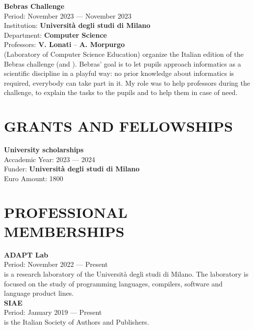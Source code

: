 \documentclass[a4paper,9pt]{extarticle}
\begin{document}
\noindent
\textbf{Bebras Challenge} \\
Period: November 2023 --- November 2023 \\
Institution: \textbf{Universit\`a degli studi di Milano} \\
Department: \textbf{Computer Science} \\
Professors: \textbf{V. Lonati} -- \textbf{A. Morpurgo} \\
\aladdin (Laboratory of Computer Science Education) organize the Italian edition of the Bebras challenge (\bebrasit and \bebrasint). Bebras' goal is to let pupils approach informatics as a scientific discipline in a playful way: no prior knowledge about informatics is required, everybody can take part in it.
My role was to help professors during the challenge, to explain the tasks to the pupils and to help them in case of need. \\


\section*{GRANTS AND FELLOWSHIPS}

\noindent
\newline
\textbf{University scholarships} \\
Accademic Year: 2023 --- 2024 \\
Funder: \textbf{Universit\`a degli studi di Milano} \\
Euro Amount: 1800\texteuro  \\


\section*{PROFESSIONAL MEMBERSHIPS}

\noindent
\newline
\textbf{ADAPT Lab} \\
Period: November 2022 --- Present \\
\adaptlab is a research laboratory of the Universit\`a degli studi di Milano. The laboratory is focused on the study of programming languages, compilers, software and language product lines. \\

\noindent
\textbf{SIAE} \\
Period: January 2019 --- Present \\
\siae is the Italian Society of Authors and Publishers. \\
\end{document}
